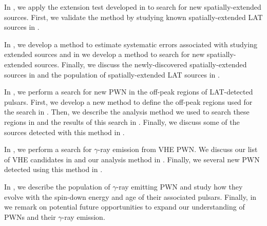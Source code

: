 In , we apply the extension test developed in
 to search for new spatially-extended sources.
First, we validate the method by studying known spatially-extended
\ac{LAT} sources in .  

In , we develop a method
to estimate systematic errors associated with studying extended
sources and in  we develop
a method to search for new spatially-extended sources.  Finally,
we discuss the newly-discovered spatially-extended sources in
 and the population of spatially-extended
\ac{LAT} sources in .

In , we perform a search for new \ac{PWN} in the
off-peak regions of \ac{LAT}-detected pulsars.  First, we develop
a new method to define the off-peak regions used for the search in
.  Then, we describe the analysis method we
used to search these regions in  and the
results of this search in .  Finally,
we discuss some of the sources detected with this method in
.

In , we perform a search for $\gamma$-ray emission
from \ac{VHE} \ac{PWN}.  We discuss our list of \ac{VHE} candidates
in  and our analysis method
in .  Finally, we several new \ac{PWN}
detected using this method in .

In , we describe the population of $\gamma$-ray
emitting \ac{PWN} and study how they evolve with the spin-down energy
and age of their associated pulsars.  Finally, in  we
remark on potential future opportunities to expand our understanding of
\acp{PWN} and their $\gamma$-ray emission.
